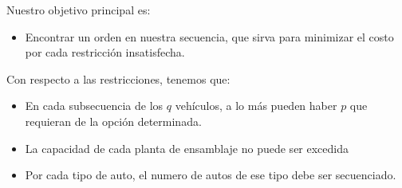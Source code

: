 Nuestro objetivo principal es:
\begin{itemize}
	\item Encontrar un orden en nuestra secuencia, que sirva para minimizar el costo por cada restricción insatisfecha.
\end{itemize}

Con respecto a las restricciones, tenemos que:
\begin{itemize}
	\item En cada subsecuencia de los $q$ vehículos, a lo más pueden haber $p$ que requieran de la opción determinada.
	\item La capacidad de cada planta de ensamblaje no puede ser excedida
	\item Por cada tipo de auto, el numero de autos de ese tipo debe ser secuenciado.
\end{itemize}



